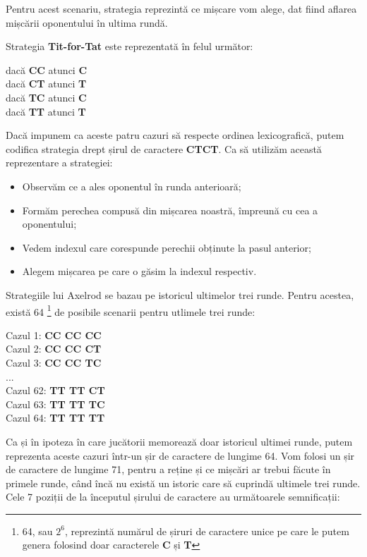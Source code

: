 Pentru acest scenariu, strategia reprezintă ce mișcare vom alege, dat fiind aflarea mișcării oponentului în ultima rundă.

Strategia \textbf{Tit-for-Tat} este reprezentată în felul următor: 

\begin{center}
	dacă \textbf{CC} atunci \textbf{C}\\
	dacă \textbf{CT} atunci \textbf{T}\\
	dacă \textbf{TC} atunci \textbf{C}\\
	dacă \textbf{TT} atunci \textbf{T}\\
\end{center}

Dacă impunem ca aceste patru cazuri să respecte ordinea lexicografică, putem codifica strategia drept șirul de caractere \textbf{CTCT}. Ca să utilizăm această reprezentare a strategiei:\\
\begin{itemize}
	\item Observăm ce a ales oponentul în runda anterioară;
	\item Formăm perechea compusă din mișcarea noastră, împreună cu cea a oponentului;
	\item Vedem indexul care corespunde perechii obținute la pasul anterior;
	\item Alegem mișcarea pe care o găsim la indexul respectiv.
\end{itemize}

Strategiile lui Axelrod se bazau pe istoricul ultimelor trei runde. Pentru acestea, există 64 \footnote{64, sau $2^6$, reprezintă numărul de șiruri de caractere unice pe care le putem genera folosind doar caracterele \textbf{C} și \textbf{T}} de posibile scenarii pentru utlimele trei runde: 

\begin{center}
	Cazul 1: \textbf{CC CC CC}\\
	Cazul 2: \textbf{CC CC CT}\\
	Cazul 3: \textbf{CC CC TC}\\
	...
	\\
	Cazul 62: \textbf{TT TT CT}\\
	Cazul 63: \textbf{TT TT TC}\\
	Cazul 64: \textbf{TT TT TT}\\
\end{center}

Ca și în  ipoteza în care jucătorii memorează doar istoricul ultimei runde, putem reprezenta aceste cazuri într-un șir de caractere de lungime 64. Vom folosi un șir de caractere de lungime 71, pentru a reține și ce mișcări ar trebui făcute în primele runde, când încă nu există un istoric care să cuprindă ultimele trei runde. Cele 7 poziții de la începutul șirului de caractere au următoarele semnificații:\\

